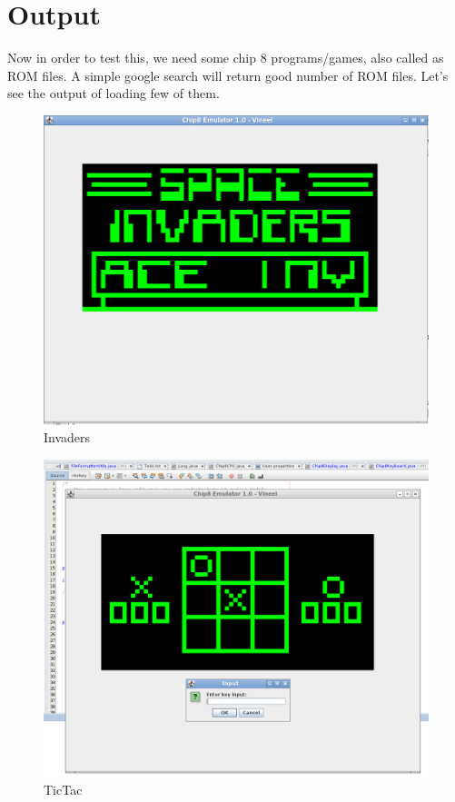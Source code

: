 \documentclass{article}
\begin{document}
\section{Output}
Now in order to test this, we need some chip 8 programs/games, also called as ROM files. A simple google search will return good number of ROM files. Let’s see the output of loading few of them.
\begin{figure}[H]
\centering
\includegraphics[width=\textwidth]{2.Emulator.png}
\caption{Invaders}
\end{figure}
\begin{figure}[H]
\centering
\includegraphics[width=\textwidth]{3.Emulator.png}
\caption{TicTac}
\end{figure}
\end{document}
